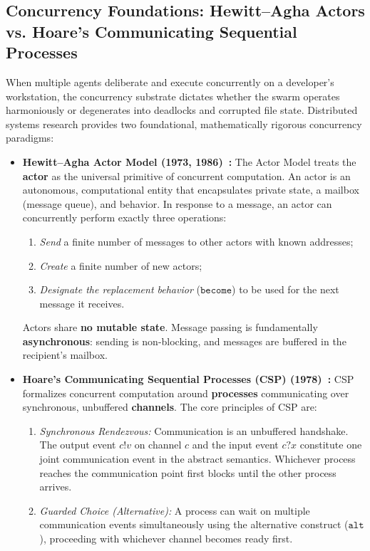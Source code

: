 \documentclass[11pt,a4paper]{article}
\begin{document}
\subsection{Concurrency Foundations: Hewitt--Agha Actors vs. Hoare's Communicating Sequential Processes}

When multiple agents deliberate and execute concurrently on a developer's workstation, the concurrency substrate dictates whether the swarm operates harmoniously or degenerates into deadlocks and corrupted file state. Distributed systems research provides two foundational, mathematically rigorous concurrency paradigms:

\begin{itemize}[leftmargin=1.8em,itemsep=3pt]
  \item \textbf{Hewitt--Agha Actor Model (1973, 1986)~:}\enspace
  The Actor Model treats the \textbf{actor} as the universal primitive of concurrent computation. An actor is an autonomous, computational entity that encapsulates private state, a mailbox (message queue), and behavior. In response to a message, an actor can concurrently perform exactly three operations:
  \begin{enumerate}[leftmargin=1.5em,itemsep=1.5pt]
    \item \emph{Send} a finite number of messages to other actors with known addresses;
    \item \emph{Create} a finite number of new actors;
    \item \emph{Designate the replacement behavior} ($\mathtt{become}$) to be used for the next message it receives.
  \end{enumerate}
  Actors share \textbf{no mutable state}. Message passing is fundamentally \textbf{asynchronous}: sending is non-blocking, and messages are buffered in the recipient's mailbox.

  \item \textbf{Hoare's Communicating Sequential Processes (CSP) (1978)~:}\enspace
  CSP formalizes concurrent computation around \textbf{processes} communicating over synchronous, unbuffered \textbf{channels}. The core principles of CSP are:
  \begin{enumerate}[leftmargin=1.5em,itemsep=1.5pt]
    \item \emph{Synchronous Rendezvous:} Communication is an unbuffered handshake. The output event $c!v$ on channel $c$ and the input event $c?x$ constitute one joint communication event in the abstract semantics. Whichever process reaches the communication point first blocks until the other process arrives.
    \item \emph{Guarded Choice (Alternative):} A process can wait on multiple communication events simultaneously using the alternative construct ($\mathtt{alt}$), proceeding with whichever channel becomes ready first.
  \end{enumerate}
\end{itemize}
\end{document}
